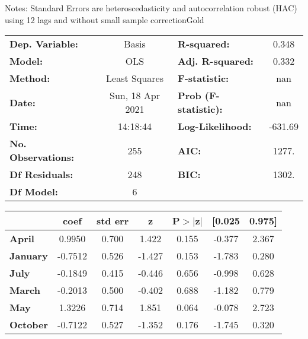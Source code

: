 Notes: \newline
 [1] Standard Errors are heteroscedasticity and autocorrelation robust (HAC) using 12 lags and without small sample correctionGold\begin{center}
\begin{tabular}{lclc}
\toprule
\textbf{Dep. Variable:}    &      Basis       & \textbf{  R-squared:         } &     0.348   \\
\textbf{Model:}            &       OLS        & \textbf{  Adj. R-squared:    } &     0.332   \\
\textbf{Method:}           &  Least Squares   & \textbf{  F-statistic:       } &       nan   \\
\textbf{Date:}             & Sun, 18 Apr 2021 & \textbf{  Prob (F-statistic):} &      nan    \\
\textbf{Time:}             &     14:18:44     & \textbf{  Log-Likelihood:    } &   -631.69   \\
\textbf{No. Observations:} &         255      & \textbf{  AIC:               } &     1277.   \\
\textbf{Df Residuals:}     &         248      & \textbf{  BIC:               } &     1302.   \\
\textbf{Df Model:}         &           6      & \textbf{                     } &             \\
\bottomrule
\end{tabular}
\begin{tabular}{lcccccc}
                 & \textbf{coef} & \textbf{std err} & \textbf{z} & \textbf{P$> |$z$|$} & \textbf{[0.025} & \textbf{0.975]}  \\
\midrule
\textbf{April}   &       0.9950  &        0.700     &     1.422  &         0.155        &       -0.377    &        2.367     \\
\textbf{January} &      -0.7512  &        0.526     &    -1.427  &         0.153        &       -1.783    &        0.280     \\
\textbf{July}    &      -0.1849  &        0.415     &    -0.446  &         0.656        &       -0.998    &        0.628     \\
\textbf{March}   &      -0.2013  &        0.500     &    -0.402  &         0.688        &       -1.182    &        0.779     \\
\textbf{May}     &       1.3226  &        0.714     &     1.851  &         0.064        &       -0.078    &        2.723     \\
\textbf{October} &      -0.7122  &        0.527     &    -1.352  &         0.176        &       -1.745    &        0.320     \\

\end{tabular}
\end{center}
